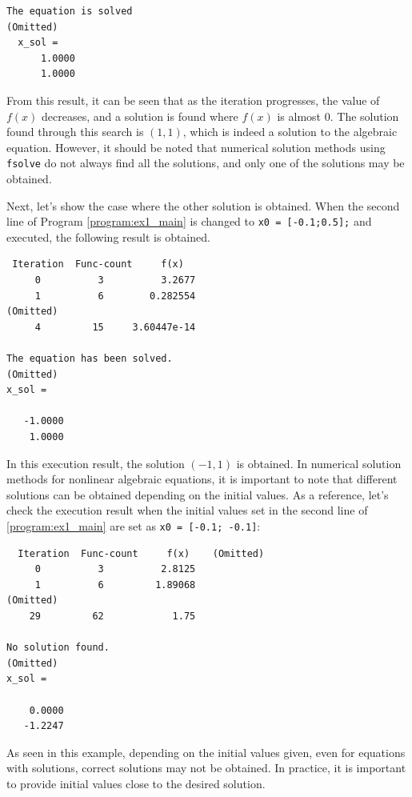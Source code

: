 \documentclass[graybox, envcountchap]{svmult}
\begin{document}
\begin{example}
\begin{execution}
\begin{verbatim}
The equation is solved
(Omitted)
  x_sol =
      1.0000
      1.0000
\end{verbatim}
\end{execution}

From this result, it can be seen that as the iteration progresses, the value of
$f(x)$ decreases, and a solution is found where $f(x)$ is almost 0. The solution
found through this search is $(1, 1)$, which is indeed a solution to the
algebraic equation. However, it should be noted that numerical solution methods
using \verb|fsolve| do not always find all the solutions, and only one of the
solutions may be obtained.

Next, let's show the case where the other solution is obtained. When the second
line of Program \nobreak\ref{program:ex1_main} is changed to \verb|x0 = [-0.1;0.5];|
and executed, the following result is obtained.

\smallskip
\begin{execution}
\begin{verbatim}
 Iteration  Func-count     f(x)   
     0          3          3.2677
     1          6        0.282554
(Omitted)
     4         15     3.60447e-14

The equation has been solved.
(Omitted)
x_sol =

   -1.0000
    1.0000
\end{verbatim}
\end{execution}

In this execution result, the solution $(-1, 1)$ is obtained. In numerical
solution methods for nonlinear algebraic equations, it is important to note that
different solutions can be obtained depending on the initial values. As a
reference, let's check the execution result when the initial values set in the
second line of \nobreak\ref{program:ex1_main} are set as \verb|x0 = [-0.1; -0.1]|:

\smallskip
\begin{execution}
    \begin{verbatim}
  Iteration  Func-count     f(x)    (Omitted) 
     0          3          2.8125
     1          6         1.89068
(Omitted)
    29         62            1.75

No solution found.
(Omitted)
x_sol =

    0.0000
   -1.2247
\end{verbatim}
\end{execution}

As seen in this example, depending on the initial values given, even for
equations with solutions, correct solutions may not be obtained. In practice, it
is important to provide initial values close to the desired solution.
\end{example}
\end{document}
